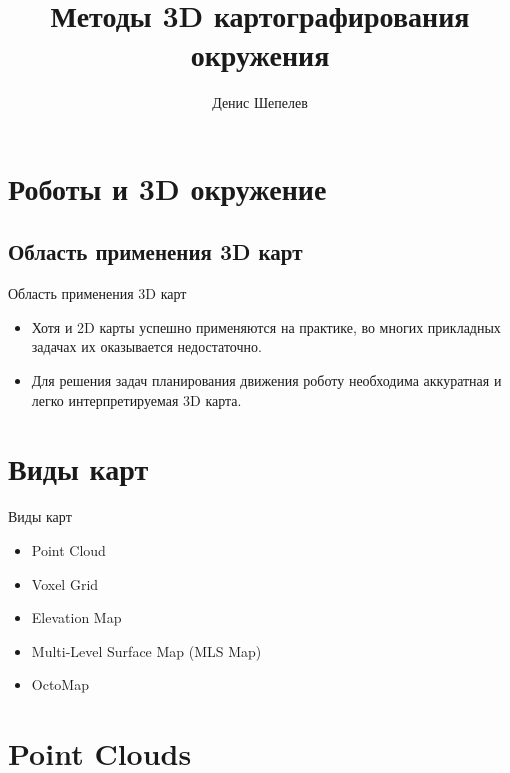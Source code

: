 \documentclass[9pt]{beamer}
\title{Методы 3D картографирования окружения}
\author{Денис Шепелев}
\institute[Universities of Somewhere and Elsewhere] %
{
  073а\\
}
\date{}
\begin{document}
\begin{frame}
  \titlepage
\end{frame}


\section{Роботы и 3D окружение}

\subsection{Область применения 3D карт}

\begin{frame}{Область применения 3D карт}
  \begin{itemize}
  \item 
  {
    Хотя и 2D карты успешно применяются на практике, во многих прикладных задачах их оказывается недостаточно. 
  }
  \item 
  {
    Для решения задач планирования движения роботу необходима аккуратная и легко интерпретируемая 3D карта.
  }
  \end{itemize}
\end{frame}

\section{Виды карт}

\begin{frame}{Виды карт}
  \begin{itemize}
  \item 
  {
    Point Cloud  
  }
  \item 
  {   
    Voxel Grid
  }
  \item
  {
    Elevation Map
  }
  \item
  {
    Multi-Level Surface Map (MLS Map) 
  }
  \item
  {
    OctoMap
  }
  \end{itemize}
\end{frame}


\section{Point Clouds}
\end{document}
